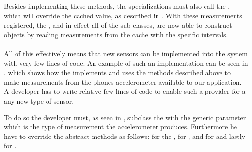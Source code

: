Besides implementing these methods, the specializations must also call the , which will override the cached value, as described in . With these measurements registered, the , and in effect all of the sub-classes, are now able to construct  objects by reading measurements from the cache with the specific intervals. 
\\\\
All of this effectively means that new sensors can be implemented into the system with very few lines of code. An example of such an implementation can be seen in , which shows how the  implements and uses the methods described above to make measurements from the phones accelerometer available to our application. A developer has to write relative few lines of code to enable such a provider for a any new type of sensor. 


To do so the developer must, as seen in , subclass the  with the generic parameter  which is the type of measurement the accelerometer produces. Furthermore he have to override the abstract methods as follows:  for the ,  for ,  and  for  and lastly  for .


\FloatBarrier

